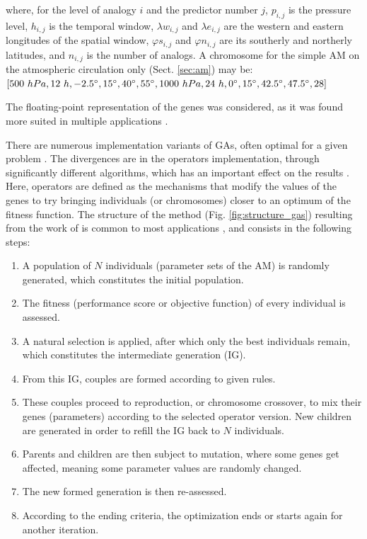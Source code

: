 \documentclass{ametsoc}
\begin{document}
\begin{equation}
[p_{i,j}, h_{i,j}, \lambda w_{i,j}, \lambda e_{i,j}, \varphi s_{i,j}, \varphi n_{i,j}, p_{i,j+1}, h_{i,j+1}, ..., n_{i}, ... p_{i+1,j}, h_{i+1,j}, ..., n_{i+1}, ...]
\end{equation}
where, for the level of analogy $i$ and the predictor number $j$, $p_{i,j}$ is the pressure level, $h_{i,j}$ is the temporal window, $\lambda w_{i,j}$ and $\lambda e_{i,j}$ are the western and eastern longitudes of the spatial window, $\varphi s_{i,j}$ and $\varphi n_{i,j}$ are its southerly and northerly latitudes, and $n_{i,j}$ is the number of analogs. A chromosome for the simple AM on the atmospheric circulation only (Sect. \ref{sec:am}) may be: $[500~hPa, 12~h, -2.5\degree, 15\degree, 40\degree, 55\degree, 1000~hPa, 24~h, 0\degree, 15\degree, 42.5\degree, 47.5\degree, 28]$

The floating-point representation \citep[instead of the canonical binary, see][]{Goldberg1989, Goldberg1990a, Holland1992b} of the genes was considered, as it was found more suited in multiple applications \citep{Michalewicz1996, Herrera1998a, Haupt2004, Back1996b, Gaffney2010a}. 

There are numerous implementation variants of GAs, often optimal for a given problem \citep{Hart1991a, Schraudolph1992a}. The divergences are in the operators implementation, through significantly different algorithms, which has an important effect on the results \citep{Gaffney2010a}. Here, operators are defined as the mechanisms that modify the values of the genes to try bringing individuals (or chromosomes) closer to an optimum of the fitness function. The structure of the method (Fig. \ref{fig:structure_gas}) resulting from the work of \citet{Holland1992b} is common to most applications \citep{Back1993b}, and consists in the following steps:

\begin{enumerate}
	\item A population of $N$ individuals (parameter sets of the AM) is randomly generated, which constitutes the initial population.
	\item The fitness (performance score or objective function) of every individual is assessed.
	\item A natural selection is applied, after which only the best individuals remain, which constitutes the intermediate generation (IG).
	\item From this IG, couples are formed according to given rules.
	\item These couples proceed to reproduction, or chromosome crossover, to mix their genes (parameters) according to the selected operator version. New children are generated in order to refill the IG back to $N$ individuals.
	\item Parents and children are then subject to mutation, where some genes get affected, meaning some parameter values are randomly changed.
	\item The new formed generation is then re-assessed.
	\item According to the ending criteria, the optimization ends or starts again for another iteration.
\end{enumerate}
\end{document}
